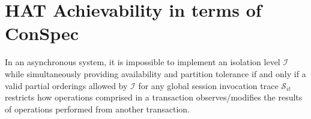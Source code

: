 \documentclass[acmlarge, ,11pt]{acmart}
\begin{document}

\section{HAT Achievability in terms of ConSpec}\label{sec:cap}
In an asynchronous system, it is impossible to implement an isolation level $\mathcal{I}$ while simultaneously providing availability and partition tolerance if and only if a valid partial orderings allowed by $\mathcal{I}$  for any global session invocation trace $\mathcal{S}_{it}$ restricts how operations comprised in a transaction observes/modifies the results of operations performed from another transaction.
\end{document}
